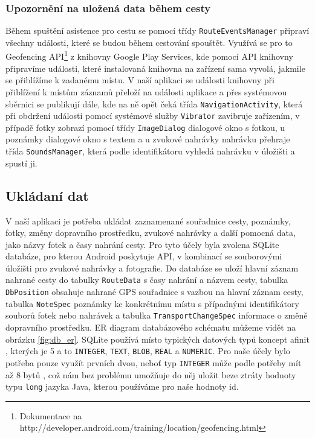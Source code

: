 \documentclass[czech,master,public,dept460,male,java,cpdeclaration]{diploma}
\begin{document}
\subsubsection{Upozornění na uložená data během cesty}
Během spuštění asistence pro cestu se pomocí třídy \texttt{RouteEventsManager} připraví všechny události,
které se budou během cestování spouštět. Využívá se pro to
Geofencing API\footnote{Dokumentace na http://developer.android.com/training/location/geofencing.html}
z knihovny Google Play Services, kde pomocí API knihovny připravíme události, které instalovaná knihovna
na zařízení sama vyvolá, jakmile se přiblížíme k zadanému místu. V naší aplikaci se události knihovny
při přiblížení k místům záznamů přeloží na události aplikace a přes systémovou sběrnici se publikují
dále, kde na ně opět čeká třída \texttt{NavigationActivity}, která při obdržení události pomocí
systémové služby \texttt{Vibrator} zavibruje zařízením, v případě fotky zobrazí pomocí třídy
\texttt{ImageDialog} dialogové okno s fotkou, u poznámky dialogové okno s textem a u zvukové nahrávky
nahrávku přehraje třída \texttt{SoundsManager}, která podle identifikátoru vyhledá nahrávku v úložišti
a spustí ji.

\subsection{Ukládaní dat}
V naší aplikaci je potřeba ukládat zaznamenané souřadnice cesty, poznámky, fotky, změny dopravního
prostředku, zvukové nahrávky a další pomocná data, jako názvy fotek a časy nahrání cesty. Pro tyto
účely byla zvolena SQLite databáze, pro kterou Android poskytuje API, v kombinací se souborovými úložišti
pro zvukové nahrávky a fotografie. Do databáze se uloží hlavní záznam nahrané cesty do tabulky \texttt{RouteData}
s časy nahrání a názvem cesty, tabulka \texttt{DbPosition} obsahuje nahrané GPS souřadnice s vazbou
na hlavní záznam cesty, tabulka \texttt{NoteSpec} poznámky ke konkrétnímu místu s případnými identifikátory
souborů fotek nebo nahrávek a tabulka \texttt{TransportChangeSpec} informace o změně dopravního prostředku.
ER diagram databázového schématu můžeme vidět na obrázku \ref{fig:db_er}. SQLite používá místo typických datových typů koncept afinit
 \cite{sqlitetypes}, kterých je 5 a to \texttt{INTEGER}, \texttt{TEXT}, \texttt{BLOB}, \texttt{REAL} a \texttt{NUMERIC}.
Pro naše účely bylo potřeba pouze využít prvních dvou, neboť typ \texttt{INTEGER} může podle potřeby
mít až 8 bytů \cite{sqlitetypes}, což nám bez problému umožňuje do něj uložit beze ztráty hodnoty typu
\texttt{long} jazyka Java, kterou používáme pro naše hodnoty id.
\end{document}
